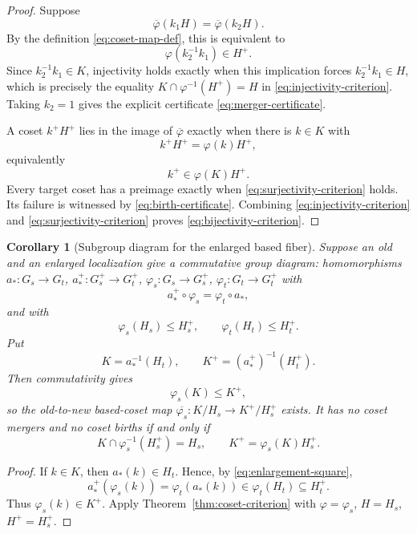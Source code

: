 \documentclass[11pt,reqno]{amsart}
\newtheorem{corollary}[theorem]{Corollary}
\theoremstyle{definition}
\theoremstyle{remark}
\begin{document}
\begin{proof}
Suppose
\[
  \overline\varphi(k_1H)=\overline\varphi(k_2H).
\]
By the definition \eqref{eq:coset-map-def}, this is equivalent to
\[
  \varphi(k_2^{-1}k_1)\in H^+ .
\]
Since \( k_2^{-1}k_1\in K \), injectivity holds exactly when this implication forces \( k_2^{-1}k_1\in H \), which is precisely the equality \( K\cap\varphi^{-1}(H^+)=H \) in \eqref{eq:injectivity-criterion}.  Taking \( k_2=1 \) gives the explicit certificate \eqref{eq:merger-certificate}.

A coset \( k^+H^+ \) lies in the image of \( \overline\varphi \) exactly when there is \( k\in K \) with
\[
  k^+H^+=\varphi(k)H^+,
\]
equivalently
\[
  k^+\in\varphi(K)H^+ .
\]
Every target coset has a preimage exactly when \eqref{eq:surjectivity-criterion} holds.  Its failure is witnessed by \eqref{eq:birth-certificate}.  Combining \eqref{eq:injectivity-criterion} and \eqref{eq:surjectivity-criterion} proves \eqref{eq:bijectivity-criterion}.
\end{proof}
\begin{corollary}[Subgroup diagram for the enlarged based fiber]\label{cor:enlarged-fiber}
Suppose an old and an enlarged localization give a commutative group diagram: homomorphisms
\( a_*\colon G_s\to G_t \), \( a_*^+\colon G_s^+\to G_t^+ \),
\( \varphi_s\colon G_s\to G_s^+ \), \( \varphi_t\colon G_t\to G_t^+ \) with
\begin{equation}\label{eq:enlargement-square}
  a_*^+\circ\varphi_s=\varphi_t\circ a_* ,
\end{equation}
and with
\[
  \varphi_s(H_s)\leq H_s^+,\qquad \varphi_t(H_t)\leq H_t^+ .
\]
Put
\[
  K=a_*^{-1}(H_t),\qquad K^+=(a_*^+)^{-1}(H_t^+).
\]
Then commutativity gives
\[
  \varphi_s(K)\leq K^+,
\]
so the old-to-new based-coset map \( \overline{\varphi_s}\colon K/H_s\to K^+/H_s^+ \) exists.  It has no coset mergers and no coset births if and only if
\begin{equation}\label{eq:enlargement-criterion}
  K\cap\varphi_s^{-1}(H_s^+)=H_s,
  \qquad
  K^+=\varphi_s(K)H_s^+ .
\end{equation}
\end{corollary}

\begin{proof}
If \( k\in K \), then \( a_*(k)\in H_t \).  Hence, by \eqref{eq:enlargement-square},
\[
  a_*^+(\varphi_s(k))=\varphi_t(a_*(k))\in\varphi_t(H_t)\subseteq H_t^+ .
\]
Thus \( \varphi_s(k)\in K^+ \).  Apply Theorem~\ref{thm:coset-criterion} with \( \varphi=\varphi_s \), \( H=H_s \), \( H^+=H_s^+ \).
\end{proof}
\end{document}

